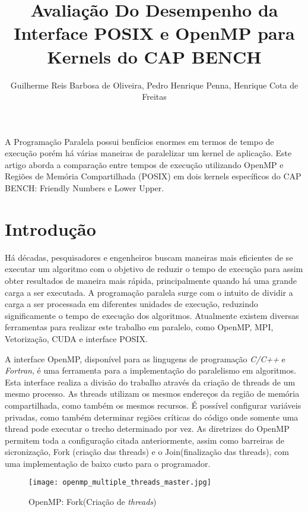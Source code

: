 \documentclass[12pt]{article}
\title{Avaliação Do Desempenho da Interface POSIX e OpenMP para Kernels do CAP BENCH}
\author{Guilherme Reis Barbosa de Oliveira, Pedro Henrique Penna, Henrique Cota de Freitas}
\begin{document}
 

\maketitle

\begin{abstract}
\end{abstract}
     
\begin{resumo} 
  A Programação Paralela possui benfícios enormes em termos de tempo de execução porém há várias maneiras de 
  paralelizar um kernel de aplicação. Este artigo aborda a comparação entre tempos de execução utilizando OpenMP e Regiões de Memória
  Compartilhada (POSIX) em dois kernels específicos do CAP BENCH: Friendly Numbers e Lower Upper. 
\end{resumo}


\section{Introdução}

Há décadas, pesquisadores e engenheiros buscam maneiras mais eficientes de se executar um algoritmo com o objetivo de reduzir o tempo de execução para assim obter resultados de maneira mais rápida, principalmente quando há uma grande carga a ser executada. A programação paralela surge com o intuito de dividir a carga a ser processada em diferentes unidades de execução, reduzindo significamente o tempo de execução dos algoritmos. Atualmente existem diversas ferramentas para realizar este trabalho em paralelo, como OpenMP, MPI, Vetorização, CUDA e interface POSIX.

A interface OpenMP, disponível para as lingugens de programação 
\textit{C/C++} e \textit{Fortran}, é uma ferramenta para a implementação do paralelismo em algoritmos. Esta interface realiza a divisão do trabalho através da criação de threads de um mesmo processo. As threads utilizam os mesmos endereços da região de memória compartilhada, como também os mesmos recursos. É possível configurar variáveis privadas, como também determinar regiões críticas do código onde somente uma thread pode executar o trecho determinado por vez. As diretrizes do OpenMP permitem toda a configuração citada anteriormente, assim como barreiras de sicronização, Fork (criação das threads) e o Join(finalização das threads), com uma implementação de baixo custo para o programador.

\begin{figure}[h!]
  \centering
  \texttt{[image: openmp\_multiple\_threads\_master.jpg]}
  \caption{OpenMP: Fork(Criação de \textit{threads})}
  \label{fig:master_thread}
\end{figure}
\end{document}
